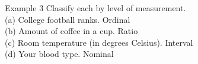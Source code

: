 \documentclass[t]{beamer}
\begin{document}
\begin{frame}{Example 3}
Classify each by level of measurement.	\newline\\
(a) \quad College football ranks. 	\quad \pause Ordinal \newline\\ \pause
(b) \quad Amount of coffee in a cup. \quad \pause Ratio \newline\\ \pause
(c) \quad Room temperature (in degrees Celsius). \quad \pause Interval \newline\\ \pause
(d) \quad Your blood type. \quad \pause Nominal
\end{frame}

\end{document}
